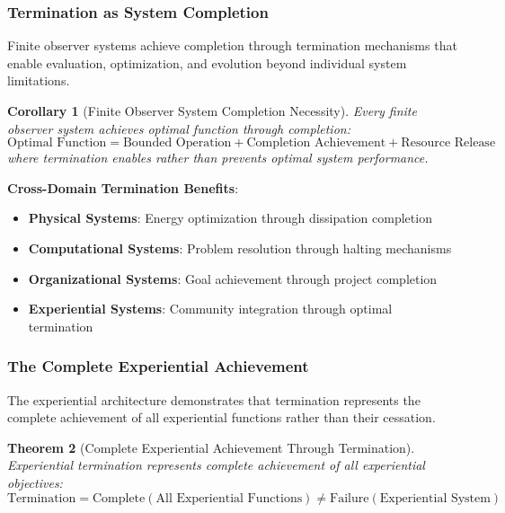 \documentclass{article}
\newtheorem{theorem}{Theorem}[section]
\newtheorem{corollary}[theorem]{Corollary}
\begin{document}
\subsubsection{Termination as System Completion}

Finite observer systems achieve completion through termination mechanisms that enable evaluation, optimization, and evolution beyond individual system limitations.

\begin{corollary}[Finite Observer System Completion Necessity]
Every finite observer system achieves optimal function through completion:
\begin{equation}
\text{Optimal Function} = \text{Bounded Operation} + \text{Completion Achievement} + \text{Resource Release}
\end{equation}
where termination enables rather than prevents optimal system performance.
\end{corollary}

\textbf{Cross-Domain Termination Benefits}:

\begin{itemize}
\item \textbf{Physical Systems}: Energy optimization through dissipation completion
\item \textbf{Computational Systems}: Problem resolution through halting mechanisms
\item \textbf{Organizational Systems}: Goal achievement through project completion
\item \textbf{Experiential Systems}: Community integration through optimal termination
\end{itemize}

\subsubsection{The Complete Experiential Achievement}

The experiential architecture demonstrates that termination represents the complete achievement of all experiential functions rather than their cessation.

\begin{theorem}[Complete Experiential Achievement Through Termination]
\label{thm:complete_achievement}
Experiential termination represents complete achievement of all experiential objectives:
\begin{equation}
\text{Termination} = \text{Complete}(\text{All Experiential Functions}) \neq \text{Failure}(\text{Experiential System})
\end{equation}
\end{theorem}
\end{document}
